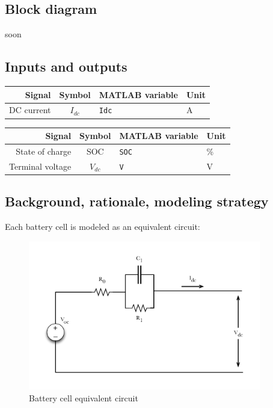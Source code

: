 \documentclass[../SimBALink.tex]{subfiles}
\begin{document}
\subsection{Block diagram}
soon

\subsection{Inputs and outputs}
\begin{tabular}{ r | c | l | l }
		Signal						&	Symbol		&	MATLAB variable	&	Unit						\\\hline
		DC current					&	$I_{dc}$		&	\texttt{Idc}		&	A		\\
	\end{tabular}
	
\begin{tabular}{ r | c | l | l }
		Signal						&	Symbol				&	MATLAB variable	&	Unit						\\\hline
		State of charge				&	SOC					&	\texttt{SOC}		&	\%		\\
		Terminal voltage				&	$V_{dc}$				&	\texttt{V}			&	V		\\
	\end{tabular}
	
\subsection{Background, rationale, modeling strategy}
		Each battery cell is modeled as an equivalent circuit:
		
		\begin{figure}[h!]
				\centering
				\includegraphics[width=4in]{Battery_pack_equivalent_circuit}
				\caption{Battery cell equivalent circuit}
				\label{fig:battery_pack_equivalent_circuit}
		\end{figure}
		\FloatBarrier
		
\end{document}
